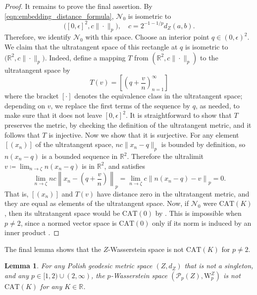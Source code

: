 \documentclass{article}
\newtheorem{lemma}[proposition]{Lemma}
\theoremstyle{definition}
\newcommand{\WZ}{\mathcal{P}_p(Z)}
\newcommand{\wz}{\mathrm{W}_p^Z}
\begin{document}
\begin{proof}
    It remains to prove the final assertion. By \eqref{eqn:embedding_distance_formula}, $\mathcal{N}_0$ is isometric to
    \begin{equation}
\bigl([0,\epsilon]^2,c\|\cdot\|_p\bigr),
    \quad
    c=2^{-1-1/p}d_Z(a,b).
    \end{equation}
    Therefore, we identify $\mathcal{N}_0$ with this space. 
    Choose an interior point \(q\in(0,\epsilon)^2\). We claim that the ultratangent space of this
    rectangle at \(q\) is isometric to $ \bigl(\mathbb{R}^2,c\|\cdot\|_p\bigr).$ Indeed, define a mapping $T$ from $(\mathbb{R}^2,c\|\cdot \|_p)$ to the ultratangent space by 
    \begin{equation}
    T(v) = \left[\left(q+\frac{v}{n}\right)_{n=1}^{\infty}\right]
    \end{equation}
    where the bracket $[\cdot]$ denotes the equivalence class in the ultratangent space; depending on $v$, we replace the first terms of the sequence by $q$, as needed, to make sure that it does not leave $[0,\epsilon]^2$. It is straightforward to show that $T$ preserves the metric, by checking the definition of the ultratangent metric, and it follows that $T$ is injective. Now we show that it is surjective. For any element $[(x_n)]$ of the ultratangent space, $nc\|x_n-q\|_{p}$ is bounded by definition, so $n(x_n-q)$ is a bounded sequence in $\mathbb{R}^2$. Therefore the ultralimit $v\coloneqq \lim_{n\to \zeta}n(x_n-q)$ is in $\mathbb{R}^2$, and satisfies
    \begin{equation}
        \lim_{n\to \zeta}nc\left\|x_n - \left(q+\frac{v}{n}\right)\right\|_p=\lim_{n\to \zeta}c\left\|n(x_n -q)-v\right\|_p=0.
    \end{equation}
    That is, $[(x_n)]$ and $T(v)$ have distance zero in the ultratangent metric, and they are equal as elements of the ultratangent space. Now, if \(\mathcal{N}_0\) were \(\mathrm{CAT}(K)\), then its ultratangent space would be
    \(\mathrm{CAT}(0)\) by \cite[Theorem 13.1]{alexander2024alexandrov}. This is impossible
    when \(p\neq2\), since a normed vector space is \(\mathrm{CAT}(0)\) only
    if its norm is induced by an inner product
    \cite[Proposition II.1.14]{bridsonhaefliger1999}.
\end{proof}

The final lemma shows that the $Z$-Wasserstein space is not $\mathrm{CAT}(K)$ for $p\neq 2$. 

\begin{lemma}
    \label{lem:Wasserstein_upper_curvature_pneq2}
    For any Polish geodesic metric space $(Z, d_Z)$ that is not a singleton, and any $p \in [1,2) \cup (2,\infty)$, the $p$-Wasserstein space $(\WZ, \wz)$  is not $\mathrm{CAT}(K)$ for any $K\in \mathbb{R}$.
\end{lemma}
\end{document}
